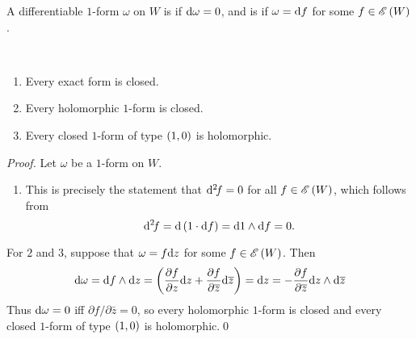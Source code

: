 \documentclass[../Moduli_Spaces_of_Riemann_Surfaces.tex]{subfiles}
\begin{document}
    \begin{definition}
        A differentiable $1$-form $\omega$ on $W$ is  if $\mathrm{d}\omega=0$, and is  if $\omega=\mathrm{d} f$ for some $f\in\mathscr{E}\left(W\right)$.
    \end{definition}
    \begin{proposition}\ 
        \begin{enumerate}
            \item Every exact form is closed.
                \vspace{-0.05in}
            \item Every holomorphic $1$-form is closed.
                \vspace{-0.05in}
            \item Every closed $1$-form of type $\left(1,0\right)$ is holomorphic.
        \end{enumerate}
    \end{proposition}
    \begin{proof}
        Let $\omega$ be a $1$-form on $W$.
        \begin{enumerate}
            \item This is precisely the statement that $\mathrm{d}^2\!f=0$ for all $f\in\mathscr{E}\left(W\right)$, which follows from
                \begin{equation*}
                    \mathrm{d}^2\!f=\mathrm{d}\left(1\cdot\mathrm{d} f\right)=\mathrm{d}1\wedge\mathrm{d} f=0.
                \end{equation*}
        \end{enumerate}
        \vspace{-0.05in}
        For $2$ and $3$, suppose that $\omega=f\mathrm{d} z$ for some $f\in\mathscr{E}\left(W\right)$. Then
        \begin{equation*}
            \mathrm{d}\omega=\mathrm{d} f\wedge\mathrm{d} z=\left(\frac{\partial f}{\partial z}\mathrm{d} z+\frac{\partial f}{\partial\overline{z}}\mathrm{d}\overline{z}\right)=\mathrm{d} z=-\frac{\partial f}{\partial\overline{z}}\mathrm{d} z\wedge\mathrm{d}\overline{z}
        \end{equation*}
        Thus $\mathrm{d}\omega=0$ iff $\partial f/\partial\bar{z}=0$, so every holomorphic $1$-form is closed and every closed $1$-form of type $\left(1,0\right)$ is holomorphic.\qed
    \end{proof}
\end{document}
